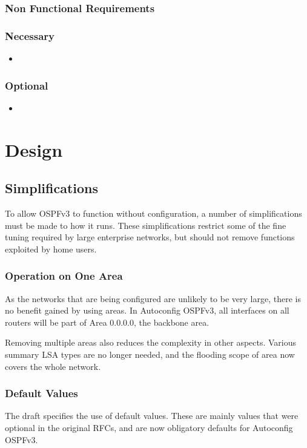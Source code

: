 \documentclass[12pt]{report}
\begin{document}
\subsection{Non Functional Requirements}
\subsection{Necessary}
\begin{itemize}
    \item 
\end{itemize}
\subsection{Optional}
\begin{itemize}
    \item 
\end{itemize}

\chapter{Design}

\section{Simplifications}
To allow OSPFv3 to function without configuration, a number of simplifications
must be made to how it runs. These simplifications restrict some of the fine
tuning required by large enterprise networks, but should not remove functions
exploited by home users. 

\subsection{Operation on One Area}
As the networks that are being configured are unlikely to be very large, there
is no benefit gained by using areas. In Autoconfig OSPFv3, all
interfaces on all routers will be part of Area 0.0.0.0, the backbone area.

Removing multiple areas also reduces the complexity in other aspects. Various
summary LSA types are no longer needed, and the flooding scope of area now
covers the whole network.

\subsection{Default Values}
The draft specifies the use of default values. These are mainly values that were
optional in the original RFCs, and are now obligatory defaults for Autoconfig
OSPFv3\@. 
\end{document}
